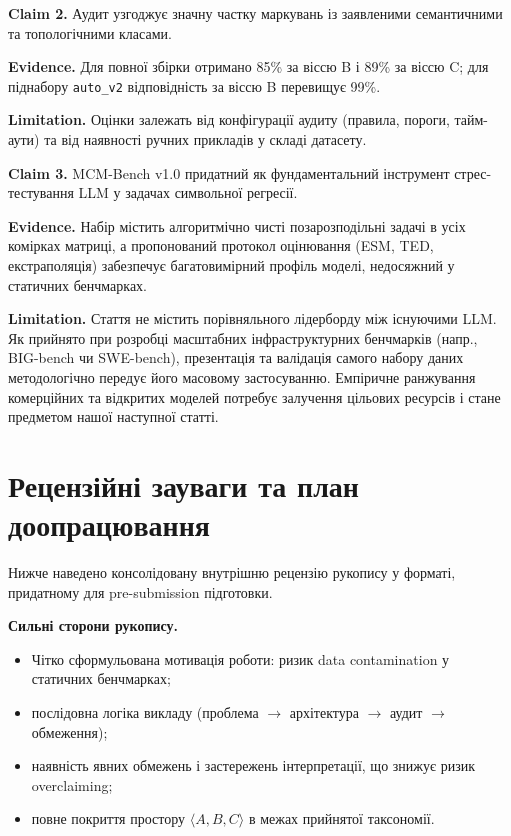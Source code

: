\documentclass[11pt]{article}
\begin{document}
\textbf{Claim 2.} Аудит узгоджує значну частку маркувань із заявленими семантичними та топологічними класами.

\textbf{Evidence.} Для повної збірки отримано 85\% за віссю B і 89\% за віссю C; для піднабору \texttt{auto\_v2} відповідність за віссю B перевищує 99\%.

\textbf{Limitation.} Оцінки залежать від конфігурації аудиту (правила, пороги, тайм-аути) та від наявності ручних прикладів у складі датасету.

\textbf{Claim 3.} MCM-Bench v1.0 придатний як фундаментальний інструмент стрес-тестування LLM у задачах символьної регресії.

\textbf{Evidence.} Набір містить алгоритмічно чисті позарозподільні задачі в усіх комірках матриці, а пропонований протокол оцінювання (ESM, TED, екстраполяція) забезпечує багатовимірний профіль моделі, недосяжний у статичних бенчмарках.

\textbf{Limitation.} Стаття не містить порівняльного лідерборду між існуючими LLM. Як прийнято при розробці масштабних інфраструктурних бенчмарків (напр., BIG-bench чи SWE-bench), презентація та валідація самого набору даних методологічно передує його масовому застосуванню. Емпіричне ранжування комерційних та відкритих моделей потребує залучення цільових ресурсів і стане предметом нашої наступної статті.

\section*{Рецензійні зауваги та план доопрацювання}

Нижче наведено консолідовану внутрішню рецензію рукопису у форматі, придатному для pre-submission підготовки.

\textbf{Сильні сторони рукопису.}
\begin{itemize}[leftmargin=1.5em]
  \item Чітко сформульована мотивація роботи: ризик data contamination у статичних бенчмарках;
  \item послідовна логіка викладу (проблема $\rightarrow$ архітектура $\rightarrow$ аудит $\rightarrow$ обмеження);
  \item наявність явних обмежень і застережень інтерпретації, що знижує ризик overclaiming;
  \item повне покриття простору $\langle A,B,C\rangle$ в межах прийнятої таксономії.
\end{itemize}
\end{document}
